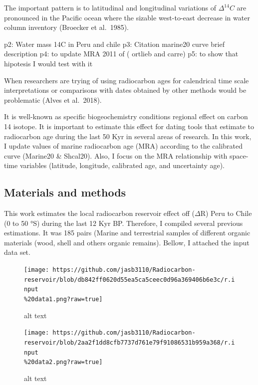\documentclass[
]{article}
\begin{document}
The important pattern is to latitudinal and longitudinal variations of
\(\Delta^{14}C\) are pronounced in the Pacific ocean where the sizable
west-to-east decrease in water column inventory (Broecker et al.~1985).

p2: Water mass 14C in Peru and chile p3: Citation marine20 curve brief
description p4: to update MRA 2011 of ( ortlieb and carre) p5: to show
that hipotesis I would test with it

When researchers are trying of using radiocarbon ages for calendrical
time scale interpretations or comparisons with dates obtained by other
methods would be problematic (Alves et al.~2018).

It is well-known as specific biogeochemistry conditions regional effect
on carbon 14 isotope. It is important to estimate this effect for dating
tools that estimate to radiocarbon age during the last 50 Kyr in several
areas of research. In this work, I update values of marine radiocarbon
age (MRA) according to the calibrated curve (Marine20 \& Shcal20). Also,
I focus on the MRA relationship with space-time variables (latitude,
longitude, calibrated age, and uncertainty age).

\hypertarget{materials-and-methods}{%
\subsection{Materials and methods}\label{materials-and-methods}}

This work estimates the local radiocarbon reservoir effect off
(\(\Delta\)R) Peru to Chile (0 to 50 °S) during the last 12 Kyr BP.
Therefore, I compiled several previous estimations. It was 185 pairs
(Marine and terrestrial samples of different organic materials (wood,
shell and others organic remains). Bellow, I attached the input data
set.

\begin{figure}
\centering
\texttt{[image: https://github.com/jasb3110/Radiocarbon-reservoir/blob/db842ff0620d55ea5ca5ceec0d96a369406b6e3c/r.input\\\%20data1.png?raw=true]}
\caption{alt text}
\end{figure}

\begin{figure}
\centering
\texttt{[image: https://github.com/jasb3110/Radiocarbon-reservoir/blob/2aa2f1dd8cfb7737d761e79f91086531b959a368/r.input\\\%20data2.png?raw=true]}
\caption{alt text}
\end{figure}
\end{document}
